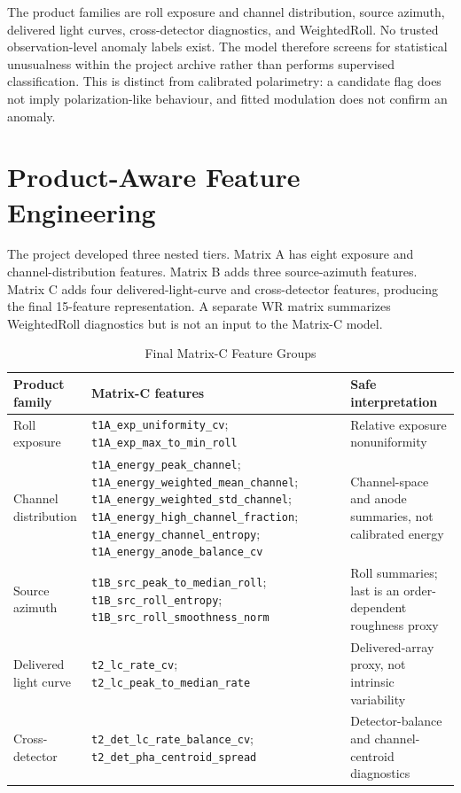 \documentclass[conference]{IEEEtran}
\begin{document}
The product families are roll exposure and channel distribution, source azimuth, delivered light curves, cross-detector diagnostics, and WeightedRoll. No trusted observation-level anomaly labels exist. The model therefore screens for statistical unusualness within the project archive rather than performs supervised classification. This is distinct from calibrated polarimetry: a candidate flag does not imply polarization-like behaviour, and fitted modulation does not confirm an anomaly.

\section{Product-Aware Feature Engineering}
The project developed three nested tiers. Matrix A has eight exposure and channel-distribution features. Matrix B adds three source-azimuth features. Matrix C adds four delivered-light-curve and cross-detector features, producing the final 15-feature representation. A separate WR matrix summarizes WeightedRoll diagnostics but is not an input to the Matrix-C model.

\begin{table}[t]
\caption{Final Matrix-C Feature Groups}
\label{tab:features}
\centering
\small
\begin{tabular}{p{2.6cm}p{8.2cm}p{5.2cm}}
\toprule
Product family & Matrix-C features & Safe interpretation\\
\midrule
Roll exposure & \texttt{t1A\_exp\_uniformity\_cv}; \texttt{t1A\_exp\_max\_to\_min\_roll} & Relative exposure nonuniformity\\
Channel distribution & \texttt{t1A\_energy\_peak\_channel}; \texttt{t1A\_energy\_weighted\_mean\_channel}; \texttt{t1A\_energy\_weighted\_std\_channel}; \texttt{t1A\_energy\_high\_channel\_fraction}; \texttt{t1A\_energy\_channel\_entropy}; \texttt{t1A\_energy\_anode\_balance\_cv} & Channel-space and anode summaries, not calibrated energy\\
Source azimuth & \texttt{t1B\_src\_peak\_to\_median\_roll}; \texttt{t1B\_src\_roll\_entropy}; \texttt{t1B\_src\_roll\_smoothness\_norm} & Roll summaries; last is an order-dependent roughness proxy\\
Delivered light curve & \texttt{t2\_lc\_rate\_cv}; \texttt{t2\_lc\_peak\_to\_median\_rate} & Delivered-array proxy, not intrinsic variability\\
Cross-detector & \texttt{t2\_det\_lc\_rate\_balance\_cv}; \texttt{t2\_det\_pha\_centroid\_spread} & Detector-balance and channel-centroid diagnostics\\
\bottomrule
\end{tabular}
\end{table}
\end{document}
